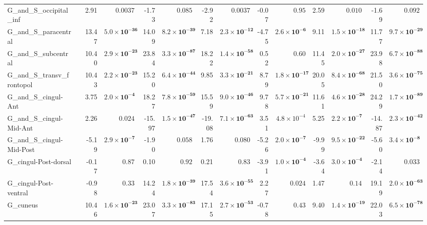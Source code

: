 {\begin{longtable}{llrrrrrrrrrrrr}
G\_and\_S\_occipital\_inf &  & 2.91 & $0.0037$ & -1.73 & $0.085$ & -2.92 & $0.0037$ & -0.07 & $0.95$ & 2.59 & $0.010$ & -1.69 & $0.092$ \\
G\_and\_S\_paracentral &  & 13.47 & $\mathbf{5.0{\times}10^{-36}}$ & 14.09 & $\mathbf{8.2{\times}10^{-39}}$ & 7.18 & $\mathbf{2.3{\times}10^{-12}}$ & -4.75 & $\mathbf{2.6{\times}10^{-6}}$ & 9.11 & $\mathbf{1.5{\times}10^{-18}}$ & 11.77 & $\mathbf{9.7{\times}10^{-29}}$ \\
G\_and\_S\_subcentral &  & 10.40 & $\mathbf{2.9{\times}10^{-23}}$ & 23.84 & $\mathbf{3.3{\times}10^{-87}}$ & 18.22 & $\mathbf{1.4{\times}10^{-58}}$ & 0.52 & $0.60$ & 11.45 & $\mathbf{2.0{\times}10^{-27}}$ & 23.98 & $\mathbf{6.7{\times}10^{-88}}$ \\
G\_and\_S\_transv\_frontopol &  & 10.43 & $\mathbf{2.2{\times}10^{-23}}$ & 15.20 & $\mathbf{6.4{\times}10^{-44}}$ & 9.85 & $\mathbf{3.3{\times}10^{-21}}$ & 8.79 & $\mathbf{1.8{\times}10^{-17}}$ & 20.05 & $\mathbf{8.4{\times}10^{-68}}$ & 21.50 & $\mathbf{3.6{\times}10^{-75}}$ \\
G\_and\_S\_cingul-Ant &  & 3.75 & $\mathbf{2.0{\times}10^{-4}}$ & 18.27 & $\mathbf{7.8{\times}10^{-59}}$ & 15.59 & $\mathbf{9.0{\times}10^{-46}}$ & 9.78 & $\mathbf{5.7{\times}10^{-21}}$ & 11.61 & $\mathbf{4.6{\times}10^{-28}}$ & 24.29 & $\mathbf{1.7{\times}10^{-89}}$ \\
G\_and\_S\_cingul-Mid-Ant &  & 2.26 & $0.024$ & -15.97 & $\mathbf{1.5{\times}10^{-47}}$ & -19.08 & $\mathbf{7.1{\times}10^{-63}}$ & 3.51 & $4.8{\times}10^{-4}$ & 5.25 & $\mathbf{2.2{\times}10^{-7}}$ & -14.87 & $\mathbf{2.3{\times}10^{-42}}$ \\
G\_and\_S\_cingul-Mid-Post &  & -5.19 & $\mathbf{2.9{\times}10^{-7}}$ & -1.90 & $0.058$ & 1.76 & $0.080$ & -5.26 & $\mathbf{2.0{\times}10^{-7}}$ & -9.99 & $\mathbf{9.5{\times}10^{-22}}$ & -5.60 & $\mathbf{3.4{\times}10^{-8}}$ \\
G\_cingul-Post-dorsal &  & -0.17 & $0.87$ & 0.10 & $0.92$ & 0.21 & $0.83$ & -3.91 & $\mathbf{1.0{\times}10^{-4}}$ & -3.64 & $\mathbf{3.0{\times}10^{-4}}$ & -2.14 & $0.033$ \\
G\_cingul-Post-ventral &  & -0.98 & $0.33$ & 14.24 & $\mathbf{1.8{\times}10^{-39}}$ & 17.54 & $\mathbf{3.6{\times}10^{-55}}$ & 2.27 & $0.024$ & 1.47 & $0.14$ & 19.19 & $\mathbf{2.0{\times}10^{-63}}$ \\
G\_cuneus &  & 10.46 & $\mathbf{1.6{\times}10^{-23}}$ & 23.07 & $\mathbf{3.3{\times}10^{-83}}$ & 17.15 & $\mathbf{2.7{\times}10^{-53}}$ & -0.78 & $0.43$ & 9.40 & $\mathbf{1.4{\times}10^{-19}}$ & 22.03 & $\mathbf{6.5{\times}10^{-78}}$ \\

\end{longtable}}
